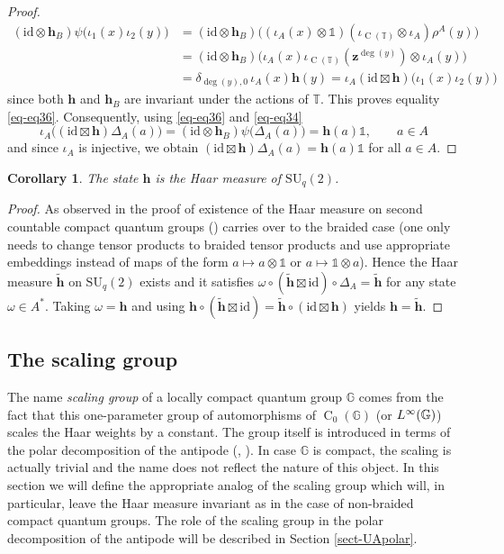 \documentclass[12pt,reqno,a4paper]{amsart}
\newtheorem{corollary}[proposition]{Corollary}
\theoremstyle{definition}
\newcommand{\comp}{\circ}
\newcommand{\I}{\mathds{1}}
\newcommand{\id}{\mathrm{id}}
\newcommand{\tens}{\otimes}
\newcommand{\GG}{\mathbb{G}}
\newcommand{\TT}{\mathbb{T}}
\newcommand{\bh}{{\boldsymbol{h}}}
\newcommand{\bz}{{\boldsymbol{z}}}
\DeclareMathOperator{\C}{C}
\DeclareMathOperator{\Linf}{\mathnormal{L}^{\infty}}
\newcommand{\SU}{\mathrm{SU}}
\numberwithin{equation}{section}
\begin{document}
\begin{proof}
\begin{align*}
(\id\tens\bh_B)\psi\bigl(\iota_1(x)\iota_2(y)\bigr)
&=(\id\tens\bh_B)
\bigl((\iota_A(x)\tens\I)(\iota_{\C(\TT)}\tens\iota_A)\rho^A(y)\bigr)\\
&=(\id\tens\bh_B)\bigl(\iota_A(x)\iota_{\C(\TT)}(\bz^{\deg(y)})\tens\iota_A(y)\bigr)\\
&=\delta_{\deg(y),0}\,\iota_A(x)\bh(y)
=\iota_A(\id\boxtimes\bh)\bigl(\iota_1(x)\iota_2(y)\bigr)
\end{align*}
since both $\bh$ and $\bh_B$ are invariant under the actions of $\TT$. This proves equality \eqref{eq-eq36}. Consequently, using \eqref{eq-eq36} and \eqref{eq-eq34}
\[
\iota_A\bigl((\id\boxtimes\bh)\Delta_A(a)\bigr)
=(\id\tens\bh_B)\psi\bigl(\Delta_A(a)\bigr)
=\bh(a)\I,\qquad a\in A
\]
and since $\iota_A$ is injective, we obtain $(\id\boxtimes\bh)\Delta_A(a)=\bh(a)\I$ for all $a\in A$.
\end{proof}

\begin{corollary}\label{cor-hHaar}
The state $\bh$ is the Haar measure of $\SU_q(2)$.
\end{corollary}

\begin{proof}
As observed in \cite[Proof of Proposition 7.2]{BraidedSU2-arXiv} the proof of existence of the Haar measure on second countable compact quantum groups (\cite[Section 3]{CQGs}) carries over to the braided case (one only needs to change tensor products to braided tensor products and use appropriate embeddings instead of maps of the form $a\mapsto a\tens\I$ or $a\mapsto\I\tens a$). Hence the Haar measure $\widetilde{\bh}$ on $\SU_q(2)$ exists and it satisfies $\omega\comp(\widetilde{\bh}\boxtimes\id)\comp\Delta_A=\widetilde{\bh}$ for any state $\omega\in A^*$. Taking $\omega=\bh$ and using $\bh\comp(\widetilde{\bh}\boxtimes\id)=\widetilde{\bh}\comp(\id\boxtimes \bh)$ yields $\bh=\widetilde{\bh}$.
\end{proof}

\subsection{The scaling group}\label{sect-tau}

The name \emph{scaling group} of a locally compact quantum group $\GG$ comes from the fact that this one-parameter group of automorphisms of $\C_0(\GG)$ (or $\Linf(\GG)$) scales the Haar weights by a constant. The group itself is introduced in terms of the polar decomposition of the antipode (\cite[Section 5]{lcqg}, \cite{mnw}). In case $\GG$ is compact, the scaling is actually trivial and the name does not reflect the nature of this object. In this section we will define the appropriate analog of the scaling group which will, in particular, leave the Haar measure invariant as in the case of non-braided compact quantum groups. The role of the scaling group in the polar decomposition of the antipode will be described in Section \ref{sect-UApolar}.
\end{document}
